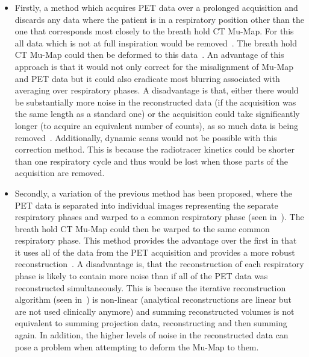            \begin{itemize}
                \item Firstly, a method which acquires \gls{PET} data over a prolonged acquisition and discards any data where the patient is in a respiratory position other than the one that corresponds most closely to the breath hold \gls{CT} \gls{Mu-Map}. For this all data which is not at full inspiration would be removed~\parencite{Liu2010, Grootjans2014}. %
                The breath hold \gls{CT} \gls{Mu-Map} could then be deformed to this data~\parencite{LungMotionBreathHoldBib}. An advantage of this approach is that it would not only correct for the misalignment of \gls{Mu-Map} and \gls{PET} data but it could also eradicate most blurring associated with averaging over respiratory phases. A disadvantage is that, either there would be substantially more noise in the reconstructed data (if the acquisition was the same length as a standard one) or the acquisition could take significantly longer (to acquire an equivalent number of counts), as so much data is being removed~\parencite{Nehmeh2008a}. Additionally, dynamic scans would not be possible with this correction method. This is because the radiotracer kinetics could be shorter than one respiratory cycle and thus would be lost when those parts of the acquisition are removed.
                
                \item Secondly, a variation of the previous method has been proposed, where the \gls{PET} data is separated into individual images representing the separate respiratory phases and warped to a common respiratory phase (seen in~). The breath hold \gls{CT} \gls{Mu-Map} could then be warped to the same common respiratory phase. This method provides the advantage over the first in that it uses all of the data from the \gls{PET} acquisition and provides a more robust reconstruction~\parencite{4DPhaseMatchedReconBib}. A disadvantage is, that the reconstruction of each respiratory phase is likely to contain more noise than if all of the \gls{PET} data was reconstructed simultaneously. This is because the iterative reconstruction algorithm (seen in~) is non-linear (analytical reconstructions are linear but are not used clinically anymore) and summing reconstructed volumes is not equivalent to summing projection data, reconstructing and then summing again. %
                In addition, the higher levels of noise in the reconstructed data can pose a problem when attempting to deform the \gls{Mu-Map} to them.
                

\end{itemize}
